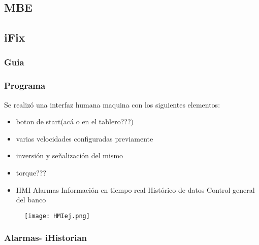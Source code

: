 \subsection{MBE}
\subsection{iFix}
\subsubsection{Guia}
\subsubsection{Programa}


Se realizó una interfaz humana maquina con los siguientes elementos:
	\begin{itemize}
		\item boton de start(acá o en el tablero???)
		\item varias velocidades configuradas previamente
		\item inversión y señalización del mismo
		\item torque???
		\item HMI
        	\subitem Alarmas
       		\subitem Información en tiempo real
        	\subitem Histórico de datos
        	\subitem Control general del banco
	\end{itemize}
	\begin{figure}[htb]
		\centering
		\texttt{[image: HMIej.png]}
	\end{figure}

\subsubsection{Alarmas- iHistorian}